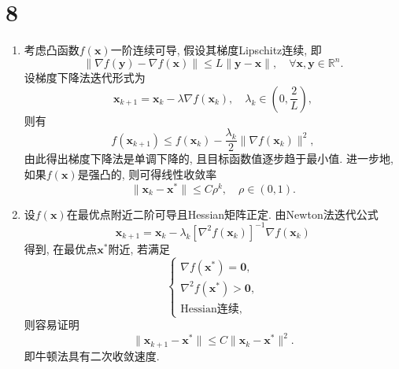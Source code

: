 \section*{8}

\begin{enumerate}
    \item
        考虑凸函数$f(\bm{x})$一阶连续可导, 假设其梯度Lipschitz连续, 即
        \begin{equation*}
            \|\nabla f(\bm{y})-\nabla f(\bm{x})\|\leq L\|\bm{y}-\bm{x}\|,\quad \forall\bm{x},\bm{y}\in\mathbb{R}^n.
        \end{equation*}
        设梯度下降法迭代形式为
        \begin{equation*}
            \bm{x}_{k+1}=\bm{x}_k-\lambda\nabla f(\bm{x}_k),\quad \lambda_k\in\left(0,\frac{2}{L}\right),
        \end{equation*}
        则有
        \begin{equation*}
            f(\bm{x}_{k+1})\leq f(\bm{x}_k)-\frac{\lambda_k}{2}\|\nabla f(\bm{x}_k)\|^2,
        \end{equation*}
        由此得出梯度下降法是单调下降的, 且目标函数值逐步趋于最小值.
        进一步地, 如果$f(\bm{x})$是强凸的, 则可得线性收敛率
        \begin{equation*}
            \|\bm{x}_k-\bm{x}^*\|\leq C\rho^k,\quad \rho\in(0,1).
        \end{equation*}

    \item
        设$f(\bm{x})$在最优点附近二阶可导且Hessian矩阵正定. 由Newton法迭代公式
        \begin{equation*}
            \bm{x}_{k+1}=\bm{x}_k-\lambda_k\left[\nabla^2 f(\bm{x}_k)\right]^{-1}\nabla f(\bm{x}_k)
        \end{equation*}
        得到, 在最优点$\bm{x}^*$附近, 若满足
        \begin{equation*}
            \begin{cases}
                \nabla f(\bm{x}^*)=\bm{0}, \\
                \nabla^2f(\bm{x}^*)>\bm{0}, \\
                \text{Hessian连续},
            \end{cases}
        \end{equation*}
        则容易证明
        \begin{equation*}
            \|\bm{x}_{k+1}-\bm{x}^*\|\leq C\|\bm{x}_k-\bm{x}^*\|^2.
        \end{equation*}
        即牛顿法具有二次收敛速度.


\end{enumerate}
